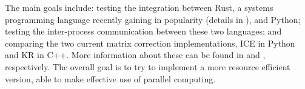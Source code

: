 The main goals include: testing the integration between Rust, a systems
programming language recently gaining in popularity (details in
), and Python; testing the inter-process communication between these two languages;
and comparing the two current matrix correction implementations, ICE in
Python and KR in C++. More information about these can be found in
 and , respectively. The overall goal is to
try to implement a more resource efficient version, able to make effective use
of parallel computing.


